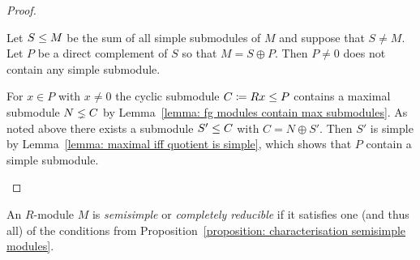 \begin{proof}
\begin{description}
      Let $S \leq M$ be the sum of all simple submodules of $M$ and suppose that $S \neq M$.
      Let $P$ be a direct complement of $S$ so that $M = S \oplus P$.
      Then $P \neq 0$ does not contain any simple submodule.
      
      For $x \in P$ with $x \neq 0$ the cyclic submodule $C \coloneqq Rx \leq P$ contains a maximal submodule $N \lneq C$ by Lemma~\ref{lemma: fg modules contain max submodules}.
      As noted above there exists a submodule $S' \leq C$ with $C = N \oplus S'$.
      Then $S'$ is simple by Lemma~\ref{lemma: maximal iff quotient is simple}, which shows that $P$ contain a simple submodule.
    \qedhere
  \end{description}
\end{proof}


\begin{definition}
  An $R$-module $M$ is \emph{semisimple} or \emph{completely reducible} if it satisfies one (and thus all) of the conditions from Proposition~\ref{proposition: characterisation semisimple modules}.
\end{definition}


